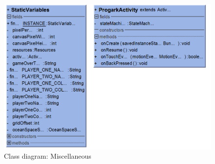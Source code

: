 \begin{figure}[ht]
    \includegraphics[width=\textwidth, angle=90]{img/Class_Misc.png}
    \caption{Class diagram: Miscellaneous}
    \label{fig:DevelopmentView}
\end{figure}